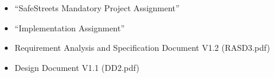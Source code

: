\clearpage
{}
\label{sect:installation}


\clearpage
{}
\label{sect:effort}



\clearpage
{}


\begin{itemize}
        \item “SafeStreets Mandatory Project Assignment”
        \item “Implementation Assignment”
        \item Requirement Analysis and Specification Document V1.2 (RASD3.pdf)
        \item Design Document V1.1 (DD2.pdf)
\end{itemize}


